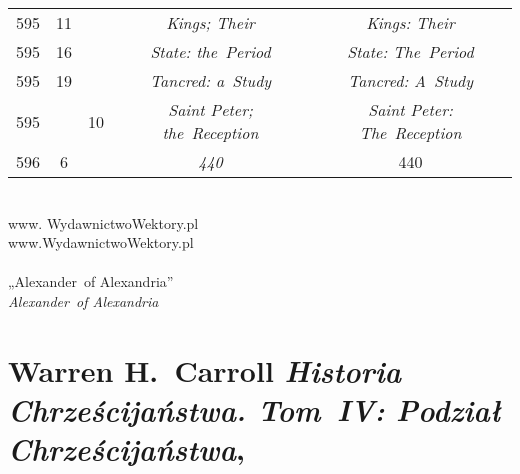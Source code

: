 \documentclass[a4paper,11pt]{article}
\begin{document}
\begin{center}
\begin{tabular}{|c|c|c|c|c|}
    595 & 11 & & \textit{Kings; Their} & \textit{Kings: Their} \\
    595 & 16 & & \textit{State: the~Period} & \textit{State: The~Period} \\
    595 & 19 & & \textit{Tancred: a~Study} & \textit{Tancred: A~Study} \\
    595 & & 10 & \textit{Saint Peter; the~Reception}
           & \textit{Saint Peter: The~Reception} \\
    596 & \hphantom{0}6 & & \textit{440} & 440 \\
    \hline
  \end{tabular}

\end{center}

\VerSpaceSix


\noindent
{} \\
\Jest  www. WydawnictwoWektory.pl \\
\Powin www.WydawnictwoWektory.pl \\
 \\
\Jest  „Alexander~of Alexandria” \\
\Powin \textit{Alexander~of Alexandria} \\













\section{Warren H.~Carroll \textit{Historia Chrześcijaństwa.
    Tom~IV: Podział Chrześcijaństwa},
  \cite{CarrollHistoriaChrzecijanstwaVolIV2011}}






\newpage

\end{document}
